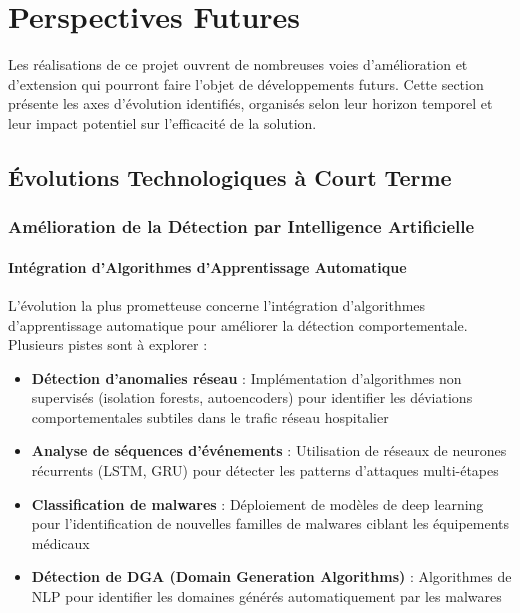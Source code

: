 \chapter{Perspectives Futures}

Les réalisations de ce projet ouvrent de nombreuses voies d'amélioration et d'extension qui pourront faire l'objet de développements futurs. Cette section présente les axes d'évolution identifiés, organisés selon leur horizon temporel et leur impact potentiel sur l'efficacité de la solution.

\section{Évolutions Technologiques à Court Terme}

\subsection{Amélioration de la Détection par Intelligence Artificielle}

\subsubsection{Intégration d'Algorithmes d'Apprentissage Automatique}

L'évolution la plus prometteuse concerne l'intégration d'algorithmes d'apprentissage automatique pour améliorer la détection comportementale. Plusieurs pistes sont à explorer :

\begin{itemize}
    \item \textbf{Détection d'anomalies réseau} : Implémentation d'algorithmes non supervisés (isolation forests, autoencoders) pour identifier les déviations comportementales subtiles dans le trafic réseau hospitalier
    \item \textbf{Analyse de séquences d'événements} : Utilisation de réseaux de neurones récurrents (LSTM, GRU) pour détecter les patterns d'attaques multi-étapes
    \item \textbf{Classification de malwares} : Déploiement de modèles de deep learning pour l'identification de nouvelles familles de malwares ciblant les équipements médicaux
    \item \textbf{Détection de DGA (Domain Generation Algorithms)} : Algorithmes de NLP pour identifier les domaines générés automatiquement par les malwares
\end{itemize}

